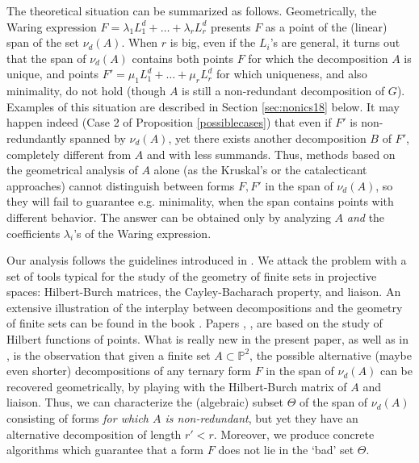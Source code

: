 \documentclass{amsart}
\newcommand{\Pj}{\mathbb{P}}
\theoremstyle{definition}
\begin{document}
The theoretical situation can be summarized as follows. Geometrically, the Waring expression $ F= \lambda_1L_1^d+\dots +\lambda_rL_r^d$ presents 
$F$ as a point of the (linear) span of the set $\nu_d(A)$. When $r$ is big, even if the $L_i$'s are general,
it turns out that the span of  $\nu_d(A)$ contains both points $F$ for which the decomposition $A$ is unique, and points 
 $F'= \mu_1L_1^d+\dots +\mu_rL_r^d$ for which uniqueness, and also minimality, do not hold  (though $A$ is still a non-redundant decomposition of $G$).
 Examples of this situation are described in Section \ref{sec:nonics18} below. It may happen indeed (Case 2 of Proposition \ref{possiblecases}) 
 that even if  $F'$ is non-redundantly spanned by $\nu_d(A)$, yet  there exists another decomposition $B$ of $F'$, completely different
 from $A$ and with less summands.
  Thus, methods based on the geometrical analysis of $A$ alone (as the Kruskal's or the catalecticant approaches) cannot 
  distinguish between forms $F,F'$ in the span  of $\nu_d(A)$, so they will fail to guarantee e.g. minimality, when the span 
  contains points with different behavior. The answer can be obtained only by analyzing $A$ {\it and} the coefficients $\lambda_i$'s of the Waring expression.
  
Our analysis follows the guidelines introduced in \cite{AngeC}. We attack the problem with a set of tools typical for the 
study of the geometry of finite sets in projective spaces: Hilbert-Burch matrices,  the Cayley-Bacharach
property, and liaison. An extensive illustration of the interplay between decompositions and the geometry of finite sets can be found in the book \cite{IK}. 
Papers \cite{BallC13}, \cite{BallBern12a}, \cite{BallBern13a} are based on the study of Hilbert functions of points. What is really new in the present paper, 
as well as in \cite{AngeC}, is the observation that given a finite set $A\subset \Pj^2$, the possible alternative (maybe even shorter) 
decompositions of any ternary form $F$ in the span of
$\nu_d(A)$ can be recovered geometrically, by playing with the Hilbert-Burch matrix of $A$ and liaison. Thus, we can characterize the (algebraic)
subset $\Theta$  of the span of $\nu_d(A)$ consisting of forms {\it for which $A$ is non-redundant}, but yet they have an alternative 
decomposition of length $r'< r$. Moreover,
we produce concrete algorithms which  guarantee that a form $F$ does not lie in the `bad' set $\Theta$.
\end{document}
